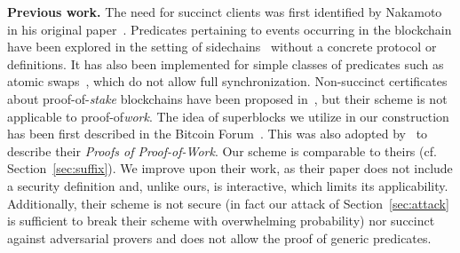 \noindent
\textbf{Previous work.} The need for succinct clients was first identified by
Nakamoto in his original paper~\cite{bitcoin}. Predicates pertaining to events
occurring in the blockchain have been explored in the setting of
sidechains~\cite{sidechains} without a concrete protocol or definitions. It has
also been implemented for simple classes of predicates such as atomic
swaps~\cite{tiernolan,herlihy2018atomic}, which do not allow full
synchronization. Non-succinct certificates about proof-of-\emph{stake}
blockchains have been proposed in~\cite{gazi2019proof}, but their scheme is not
applicable to proof-of\emph{work}. The idea of superblocks we utilize in our
construction has been first described in the Bitcoin Forum~\cite{highway}. This
was also adopted by~\cite{KLS} to describe their \emph{Proofs of Proof-of-Work}.
Our scheme is comparable to theirs (cf. Section~\ref{sec:suffix}). We improve
upon their work, as their paper does not include a security definition and,
unlike ours, is interactive, which limits its applicability. Additionally, their
scheme is not secure (in fact our attack of Section~\ref{sec:attack} is
sufficient to break their scheme with overwhelming probability) nor succinct
against adversarial provers and does not allow the proof of generic predicates.
